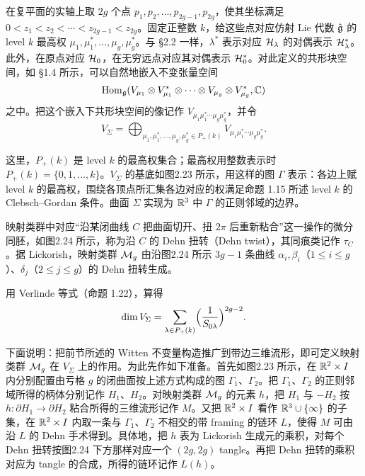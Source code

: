 在复平面的实轴上取 $2g$ 个点 $p_1,p_2,\dots,p_{2g-1},p_{2g}$，使其坐标满足 $0<z_1<z_2<\cdots<z_{2g-1}<z_{2g}$。固定正整数 $k$，给这些点对应仿射 Lie 代数 $\hat{\mathfrak{g}}$ 的 level $k$ 最高权 $\mu_1,\mu_1^*,\dots,\mu_g,\mu_g^*$。与 §2.2 一样，$\lambda^*$ 表示对应 $\mathcal{H}_\lambda$ 的对偶表示 $\mathcal{H}_\lambda^*$。此外，在原点对应 $\mathcal{H}_0$，在无穷远点对应其对偶表示 $\mathcal{H}_0^*$。对此定义的共形块空间，如 §1.4 所示，可以自然地嵌入不变张量空间
\[
  \operatorname{Hom}_{\mathfrak{g}}(V_{\mu_1}\otimes V_{\mu_1}^*\otimes\cdots\otimes V_{\mu_g}\otimes V_{\mu_g}^*,\mathbb{C})
\]
之中。把这个嵌入下共形块空间的像记作 $V_{\mu_1\mu_1^*\cdots\mu_g\mu_g^*}$，并令
\[
  V_\Sigma=\bigoplus_{\mu_1,\mu_1^*,\dots,\mu_g,\mu_g^*\in P_+(k)}V_{\mu_1\mu_1^*\cdots\mu_g\mu_g^*}.
\]

这里，$P_+(k)$ 是 level $k$ 的最高权集合；最高权用整数表示时 $P_+(k)=\{0,1,\dots,k\}$。$V_\Sigma$ 的基底如图2.23 所示，用这样的图 $\Gamma$ 表示：各边上赋 level $k$ 的最高权，围绕各顶点所汇集各边对应的权满足命题 1.15 所述 level $k$ 的 Clebsch--Gordan 条件。曲面 $\Sigma$ 实现为 $\mathbb{R}^3$ 中 $\Gamma$ 的正则邻域的边界。

映射类群中对应“沿某闭曲线 $C$ 把曲面切开、扭 $2\pi$ 后重新粘合”这一操作的微分同胚，如图2.24 所示，称为沿 $C$ 的 Dehn 扭转（Dehn twist），其同痕类记作 $\tau_C$。据 Lickorish，映射类群 $\mathcal{M}_g$ 由沿图2.24 所示 $3g-1$ 条曲线 $\alpha_i,\beta_i$（$1\le i\le g$）、$\delta_j$（$2\le j\le g$）的 Dehn 扭转生成。

用 Verlinde 等式（命题 1.22），算得
\[
  \dim V_\Sigma=\sum_{\lambda\in P_+(k)}\Bigl(\frac{1}{S_{0\lambda}}\Bigr)^{2g-2}.
\]

下面说明：把前节所述的 Witten 不变量构造推广到带边三维流形，即可定义映射类群 $\mathcal{M}_g$ 在 $V_\Sigma$ 上的作用。为此先作如下准备。首先如图2.23 所示，在 $\mathbb{R}^2\times I$ 内分别配置由亏格 $g$ 的闭曲面按上述方式构成的图 $\Gamma_1$、$\Gamma_2$。把 $\Gamma_1$、$\Gamma_2$ 的正则邻域所得的柄体分别记作 $H_1$、$H_2$。对映射类群 $\mathcal{M}_g$ 的元素 $h$，把 $H_1$ 与 $-H_2$ 按 $h:\partial H_1\to\partial H_2$ 粘合所得的三维流形记作 $M$。又把 $\mathbb{R}^2\times I$ 看作 $\mathbb{R}^3\cup\{\infty\}$ 的子集，在 $\mathbb{R}^2\times I$ 内取一条与 $\Gamma_1$、$\Gamma_2$ 不相交的带 framing 的链环 $L$，使得 $M$ 可由沿 $L$ 的 Dehn 手术得到。具体地，把 $h$ 表为 Lickorish 生成元的乘积，对每个 Dehn 扭转按图2.24 下方那样对应一个 $(2g,2g)$ tangle。再把 Dehn 扭转的乘积对应为 tangle 的合成，所得的链环记作 $L(h)$。

